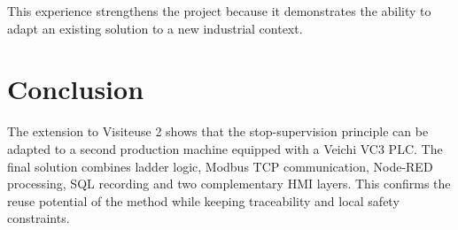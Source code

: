 This experience strengthens the project because it demonstrates the ability to adapt an existing solution to a new industrial context.

\section*{Conclusion}
The extension to Visiteuse 2 shows that the stop-supervision principle can be adapted to a second production machine equipped with a Veichi VC3 PLC. The final solution combines ladder logic, Modbus TCP communication, Node-RED processing, SQL recording and two complementary HMI layers. This confirms the reuse potential of the method while keeping traceability and local safety constraints.
